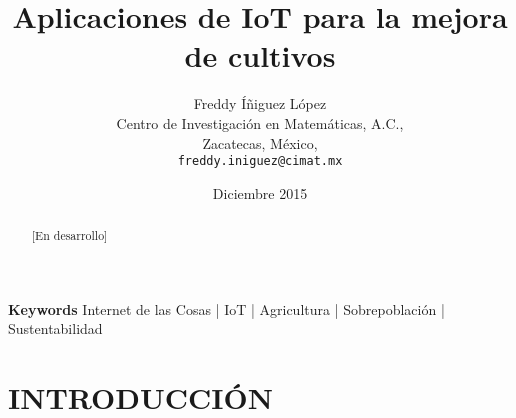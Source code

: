 \documentclass[10pt, twocolumn]{article}
\begin{document}
\title{\textbf{Aplicaciones de IoT para la mejora de cultivos}}
\author{Freddy Íñiguez López\\
	Centro de Investigación en Matemáticas, A.C.,\\
	Zacatecas, México,\\
	\texttt{freddy.iniguez@cimat.mx}}
\date{Diciembre 2015}
\maketitle

\begin{abstract}
[En desarrollo]
\end{abstract}
\paragraph{}
\textbf{Keywords} Internet de las Cosas | IoT | Agricultura | Sobrepoblación | Sustentabilidad

\section{INTRODUCCIÓN}
\end{document}
